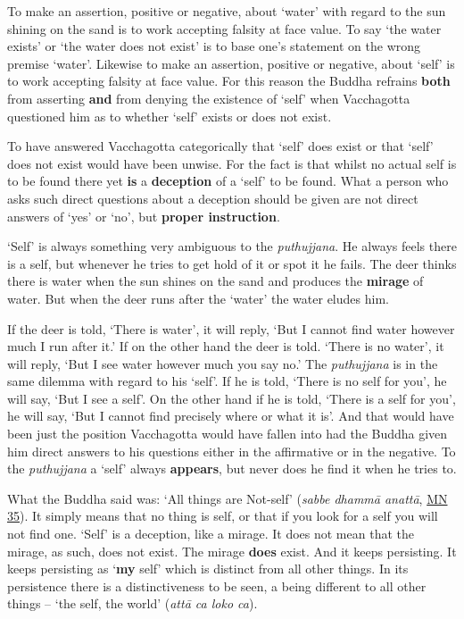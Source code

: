 To make an assertion, positive or negative, about `water' with regard to the sun shining on the sand is to work accepting falsity at face value. To say `the water exists' or `the water does not exist' is to base one's statement on the wrong premise `water'. Likewise to make an assertion, positive or negative, about `self' is to work accepting falsity at face value. For this reason the Buddha refrains \textbf{both} from asserting \textbf{and} from denying the existence of `self' when Vacchagotta questioned him as to whether `self' exists or does not exist.

To have answered Vacchagotta categorically that `self' does exist or that `self' does not exist would have been unwise. For the fact is that whilst no actual self is to be found there yet \textbf{is} a \textbf{deception} of a `self' to be found. What a person who asks such direct questions about a deception should be given are not direct answers of `yes' or `no', but \textbf{proper instruction}.

`Self' is always something very ambiguous to the \emph{puthujjana}. He always feels there is a self, but whenever he tries to get hold of it or spot it he fails. The deer thinks there is water when the sun shines on the sand and produces the \textbf{mirage} of water. But when the deer runs after the `water' the water eludes him.

If the deer is told, `There is water', it will reply, `But I cannot find water however much I run after it.' If on the other hand the deer is told. `There is no water', it will reply, `But I see water however much you say no.' The \emph{puthujjana} is in the same dilemma with regard to his `self'. If he is told, `There is no self for you', he will say, `But I see a self'. On the other hand if he is told, `There is a self for you', he will say, `But I cannot find precisely where or what it is'. And that would have been just the position Vacchagotta would have fallen into had the Buddha given him direct answers to his questions either in the affirmative or in the negative. To the \emph{puthujjana} a `self' always \textbf{appears}, but never does he find it when he tries to.

What the Buddha said was: `All things are Not-self' (\emph{sabbe dhammā anattā}, \href{https://suttacentral.net/mn35/en/sujato}{MN 35}). It simply means that no thing is self, or that if you look for a self you will not find one. `Self' is a deception, like a mirage. It does not mean that the mirage, as such, does not exist. The mirage \textbf{does} exist. And it keeps persisting. It keeps persisting as `\textbf{my} self' which is distinct from all other things. In its persistence there is a distinctiveness to be seen, a being different to all other things -- `the self, the world' (\emph{attā ca loko ca}).

